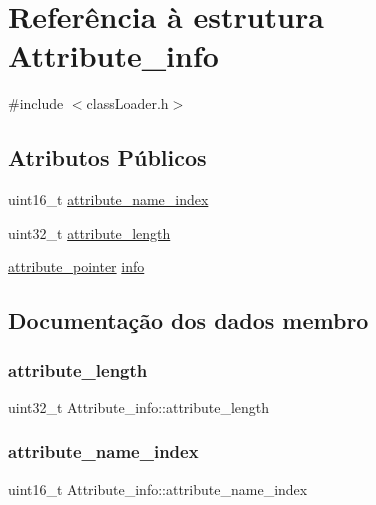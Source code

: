 \hypertarget{struct_attribute__info}{}\section{Referência à estrutura Attribute\+\_\+info}
\label{struct_attribute__info}


{\ttfamily \#include $<$class\+Loader.\+h$>$}

\subsection*{Atributos Públicos}
\begin{DoxyCompactItemize}
\item 
uint16\+\_\+t \hyperlink{struct_attribute__info_abdcda7cc76fefb752021ef8daada7e1b}{attribute\+\_\+name\+\_\+index}
\item 
uint32\+\_\+t \hyperlink{struct_attribute__info_a45cb02b2e068855fbfadeb9eb9e69fe1}{attribute\+\_\+length}
\item 
\hyperlink{unionattribute__pointer}{attribute\+\_\+pointer} \hyperlink{struct_attribute__info_af50e221b11ed1b84edbee3a06940b8eb}{info}
\end{DoxyCompactItemize}


\subsection{Documentação dos dados membro}
\hypertarget{struct_attribute__info_a45cb02b2e068855fbfadeb9eb9e69fe1}{}\label{struct_attribute__info_a45cb02b2e068855fbfadeb9eb9e69fe1} 
\subsubsection{\texorpdfstring{attribute\+\_\+length}{attribute\_length}}
{\footnotesize\ttfamily uint32\+\_\+t Attribute\+\_\+info\+::attribute\+\_\+length}

\hypertarget{struct_attribute__info_abdcda7cc76fefb752021ef8daada7e1b}{}\label{struct_attribute__info_abdcda7cc76fefb752021ef8daada7e1b} 
\subsubsection{\texorpdfstring{attribute\+\_\+name\+\_\+index}{attribute\_name\_index}}
{\footnotesize\ttfamily uint16\+\_\+t Attribute\+\_\+info\+::attribute\+\_\+name\+\_\+index}


